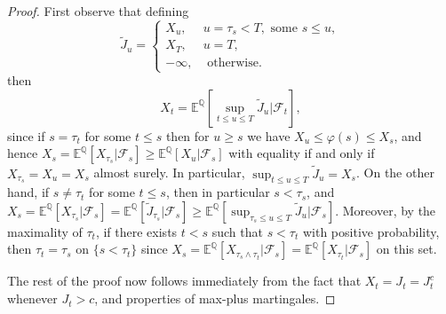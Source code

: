 \documentclass[a4paper]{amsart}
\theoremstyle{definition}
\theoremstyle{remark}
\numberwithin{equation}{section}
\newcommand{\E}{\mathbb{E}}
\newcommand{\Q}{\mathbb{Q}}
\newcommand{\Fc}{\mathcal{F}}
\newcommand{\Ep}[1]{\E\left[#1\right]}
\newcommand{\Eq}[1]{\E^{\Q}\left[#1\right]}
\begin{document}
\begin{proof}
  First observe that defining 
  \begin{equation*}
    \tilde{J}_u = 
    \begin{cases}
      X_{u}, & u= \tau_s < T, \text{ some } s \le u, \\
      X_T, & u = T, \\
      -\infty, & \text{ otherwise}.
    \end{cases}
  \end{equation*}
  then
  \begin{equation*}
    X_t = \Eq{\sup_{t \le u \le T} \tilde{J}_u | \Fc_t},
  \end{equation*}
  since if $s = \tau_t$ for some $t \le s$ then for $u \ge s$ we have $X_u \le \varphi(s) \le X_s$, and hence $X_s = \Eq{X_{\tau_s}| \Fc_s} \ge \Eq{X_u | \Fc_s}$ with equality if and only if $X_{\tau_s} = X_u = X_s$ almost surely. In particular, $\sup_{t \le u \le T} \tilde{J}_u = X_s$. On the other hand, if $s \neq \tau_t$ for some $t \le s$, then in particular $s < \tau_s$, and $X_s = \Eq{X_{\tau_s} | \Fc_s} = \Eq{\tilde{J}_{\tau_s} | \Fc_s} \ge \Eq{\sup_{\tau_s \le u \le T} \tilde{J}_u | \Fc_s}$. Moreover, by the maximality of $\tau_t$, if there exists $t < s$ such that $s < \tau_t$ with positive probability, then $\tau_t = \tau_s$ on $\{s < \tau_t\}$ since $X_s = \Eq{X_{\tau_s \wedge \tau_t}|\Fc_s} = \Eq{X_{\tau_t}|\Fc_s}$ on this set.

  The rest of the proof now follows immediately from the fact that $X_t = J_t = J^c_t$ whenever $J_t > c$, and properties of max-plus martingales.

    
\end{proof}
\end{document}
